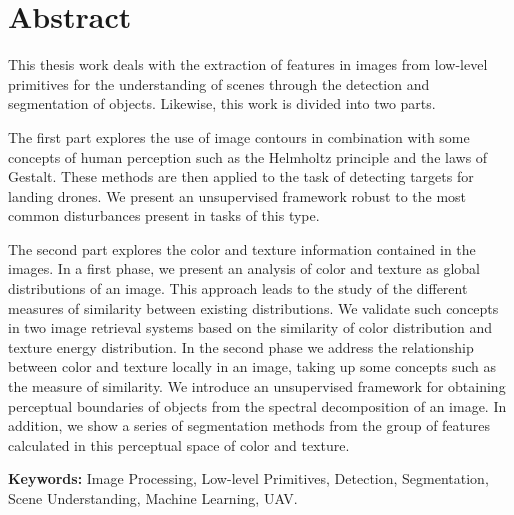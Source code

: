 \chapter*{Abstract}


\noindent This thesis work deals with the extraction of features in images from low-level primitives for the understanding of scenes through the detection and segmentation of objects. Likewise, this work is divided into two parts.
\newline 

\noindent The first part explores the use of image contours in combination with some concepts of human perception such as the Helmholtz principle and the laws of Gestalt. These methods are then applied to the task of detecting targets for landing drones. We present an unsupervised framework robust to the most common disturbances present in tasks of this type.
\newline

\noindent The second part explores the color and texture information contained in the images. In a first phase, we present an analysis of color and texture as global distributions of an image. This approach leads to the study of the different measures of similarity between existing distributions. We validate such concepts in two image retrieval systems based on the similarity of color distribution and texture energy distribution. In the second phase we address the relationship between color and texture locally in an image, taking up some concepts such as the measure of similarity. We introduce an unsupervised framework for obtaining perceptual boundaries of objects from the spectral decomposition of an image. In addition, we show a series of segmentation methods from the group of features calculated in this perceptual space of color and texture.


%

\vspace*{\fill}

\textbf{Keywords:} Image Processing, Low-level Primitives, Detection, Segmentation, Scene Understanding, Machine Learning, UAV.
